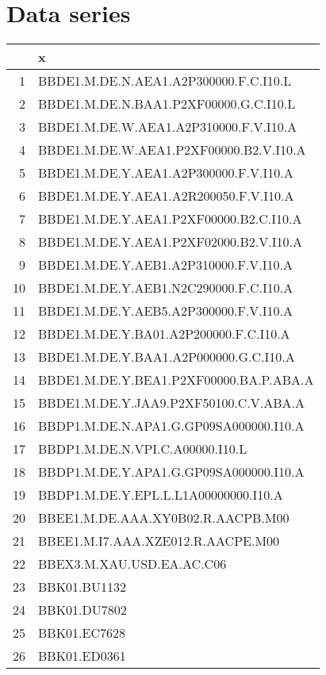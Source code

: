 \documentclass[11pt]{article}
\begin{document}
\section{Data series}
\begin{table}[ht]
\centering
\begin{tabular}{rl}
  \hline
 & x \\ 
  \hline
1 & BBDE1.M.DE.N.AEA1.A2P300000.F.C.I10.L \\ 
  2 & BBDE1.M.DE.N.BAA1.P2XF00000.G.C.I10.L \\ 
  3 & BBDE1.M.DE.W.AEA1.A2P310000.F.V.I10.A \\ 
  4 & BBDE1.M.DE.W.AEA1.P2XF00000.B2.V.I10.A \\ 
  5 & BBDE1.M.DE.Y.AEA1.A2P300000.F.V.I10.A \\ 
  6 & BBDE1.M.DE.Y.AEA1.A2R200050.F.V.I10.A \\ 
  7 & BBDE1.M.DE.Y.AEA1.P2XF00000.B2.C.I10.A \\ 
  8 & BBDE1.M.DE.Y.AEA1.P2XF02000.B2.V.I10.A \\ 
  9 & BBDE1.M.DE.Y.AEB1.A2P310000.F.V.I10.A \\ 
  10 & BBDE1.M.DE.Y.AEB1.N2C290000.F.C.I10.A \\ 
  11 & BBDE1.M.DE.Y.AEB5.A2P300000.F.V.I10.A \\ 
  12 & BBDE1.M.DE.Y.BA01.A2P200000.F.C.I10.A \\ 
  13 & BBDE1.M.DE.Y.BAA1.A2P000000.G.C.I10.A \\ 
  14 & BBDE1.M.DE.Y.BEA1.P2XF00000.BA.P.ABA.A \\ 
  15 & BBDE1.M.DE.Y.JAA9.P2XF50100.C.V.ABA.A \\ 
  16 & BBDP1.M.DE.N.APA1.G.GP09SA000000.I10.A \\ 
  17 & BBDP1.M.DE.N.VPI.C.A00000.I10.L \\ 
  18 & BBDP1.M.DE.Y.APA1.G.GP09SA000000.I10.A \\ 
  19 & BBDP1.M.DE.Y.EPL.L.L1A00000000.I10.A \\ 
  20 & BBEE1.M.DE.AAA.XY0B02.R.AACPB.M00 \\ 
  21 & BBEE1.M.I7.AAA.XZE012.R.AACPE.M00 \\ 
  22 & BBEX3.M.XAU.USD.EA.AC.C06 \\ 
  23 & BBK01.BU1132 \\ 
  24 & BBK01.DU7802 \\ 
  25 & BBK01.EC7628 \\ 
  26 & BBK01.ED0361 \\ 

\end{tabular}
\end{table}
\end{document}
